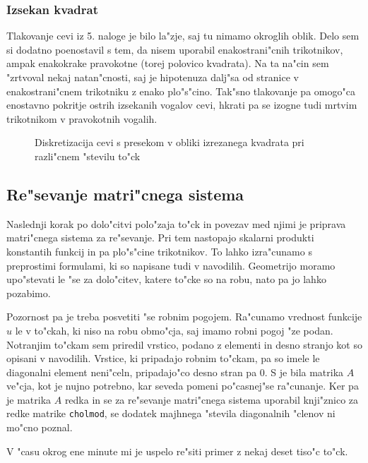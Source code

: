 \documentclass[a4paper,10pt]{article}
\begin{document}
\subsubsection{Izsekan kvadrat}

Tlakovanje cevi iz 5. naloge je bilo la"zje, saj tu nimamo okroglih oblik. Delo sem si dodatno poenostavil s tem, da nisem uporabil enakostrani"cnih trikotnikov, ampak enakokrake pravokotne (torej polovico kvadrata). Na ta na"cin sem "zrtvoval nekaj natan"cnosti, saj je hipotenuza dalj"sa od stranice v enakostrani"cnem trikotniku z enako plo"s"cino. Tak"sno tlakovanje pa omogo"ca enostavno pokritje ostrih izsekanih vogalov cevi, hkrati pa se izogne tudi mrtvim trikotnikom v pravokotnih vogalih. 

\begin{figure}[H]
\caption{Diskretizacija cevi s presekom v obliki izrezanega kvadrata pri razli"cnem "stevilu to"ck}
\label{fig:povezave-batman}
\end{figure}

\subsection{Re"sevanje matri"cnega sistema}

Naslednji korak po dolo"citvi polo"zaja to"ck in povezav med njimi je priprava matri"cnega sistema za re"sevanje. Pri tem nastopajo skalarni produkti konstantih funkcij in pa plo"s"cine trikotnikov. To lahko izra"cunamo s preprostimi formulami, ki so napisane tudi v navodilih. Geometrijo moramo upo"stevati le "se za dolo"citev, katere to"cke so na robu, nato pa jo lahko pozabimo. 

Pozornost pa je treba posvetiti "se robnim pogojem. Ra"cunamo vrednost funkcije $u$ le v to"ckah, ki niso na robu obmo"cja, saj imamo robni pogoj "ze podan. Notranjim to"ckam sem priredil vrstico, podano z elementi in desno stranjo kot so opisani v navodilih. Vrstice, ki pripadajo robnim to"ckam, pa so imele le diagonalni element neni"celn, pripadajo"co desno stran pa 0. S je bila matrika $A$ ve"cja, kot je nujno potrebno, kar seveda pomeni po"casnej"se ra"cunanje. Ker pa je matrika $A$ redka in se za re"sevanje matri"cnega sistema uporabil knji"znico za redke matrike \texttt{cholmod}, se dodatek majhnega "stevila diagonalnih "clenov ni mo"cno poznal. 

V "casu okrog ene minute mi je uspelo re"siti primer z nekaj deset tiso"c to"ck. 
\end{document}
